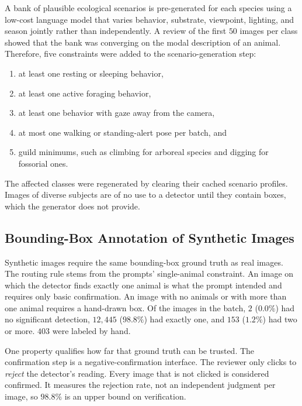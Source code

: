 A bank of plausible ecological scenarios is pre-generated for each species using a low-cost language model that varies behavior, substrate, viewpoint, lighting, and season jointly rather than independently. A review of the first $50$ images per class showed that the bank was converging on the modal description of an animal. Therefore, five constraints were added to the scenario-generation step:

\begin{enumerate}
    \item at least one resting or sleeping behavior,
    \item at least one active foraging behavior,
    \item at least one behavior with gaze away from the camera,
    \item at most one walking or standing-alert pose per batch, and
    \item guild minimums, such as climbing for arboreal species and digging for fossorial ones.
\end{enumerate}

The affected classes were regenerated by clearing their cached scenario profiles. Images of diverse subjects are of no use to a detector until they contain boxes, which the generator does not provide.

\subsection{Bounding-Box Annotation of Synthetic Images}\label{sec:synthetic_annotation}

Synthetic images require the same bounding-box ground truth as real images. The routing rule stems from the prompts' single-animal constraint. An image on which the detector finds exactly one animal is what the prompt intended and requires only basic confirmation. An image with no animals or with more than one animal requires a hand-drawn box. Of the images in the batch, $2$ ($0.0\%$) had no significant detection, $12{,}445$ ($98.8\%$) had exactly one, and $153$ ($1.2\%$) had two or more. $403$ were labeled by hand.

One property qualifies how far that ground truth can be trusted. The confirmation step is a negative-confirmation interface. The reviewer only clicks to \emph{reject} the detector's reading. Every image that is not clicked is considered confirmed. It measures the rejection rate, not an independent judgment per image, so $98.8\%$ is an upper bound on verification.

